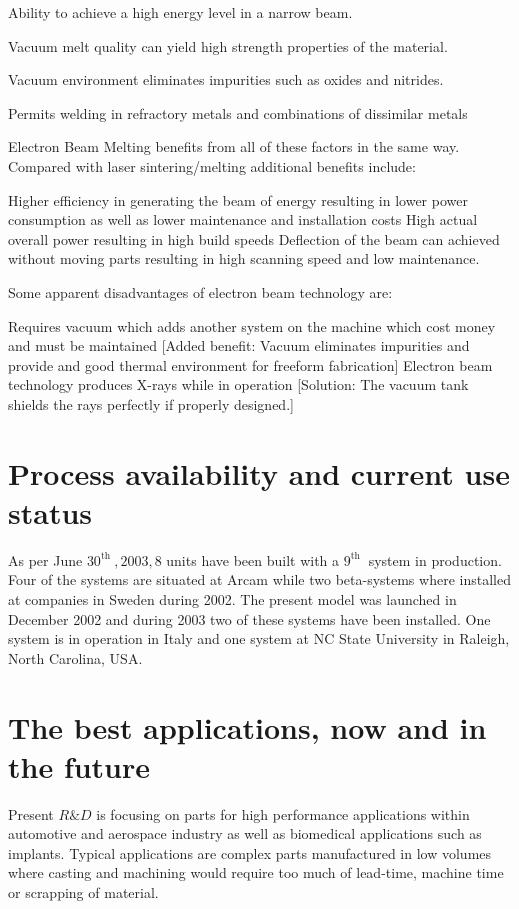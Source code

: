 \documentclass[10pt]{article}
\begin{document}
Ability to achieve a high energy level in a narrow beam.

Vacuum melt quality can yield high strength properties of the material.

Vacuum environment eliminates impurities such as oxides and nitrides.

Permits welding in refractory metals and combinations of dissimilar metals

Electron Beam Melting benefits from all of these factors in the same way. Compared with laser sintering/melting additional benefits include:

Higher efficiency in generating the beam of energy resulting in lower power consumption as well as lower maintenance and installation costs High actual overall power resulting in high build speeds Deflection of the beam can achieved without moving parts resulting in high scanning speed and low maintenance.

Some apparent disadvantages of electron beam technology are:

Requires vacuum which adds another system on the machine which cost money and must be maintained [Added benefit: Vacuum eliminates impurities and provide and good thermal environment for freeform fabrication] Electron beam technology produces X-rays while in operation [Solution: The vacuum tank shields the rays perfectly if properly designed.]

\section*{Process availability and current use status}
As per June $30^{\text {th }}, 2003,8$ units have been built with a $9^{\text {th }}$ system in production. Four of the systems are situated at Arcam while two beta-systems where installed at companies in Sweden during 2002. The present model was launched in December 2002 and during 2003 two of these systems have been installed. One system is in operation in Italy and one system at NC State University in Raleigh, North Carolina, USA.

\section*{The best applications, now and in the future}
Present $R \& D$ is focusing on parts for high performance applications within automotive and aerospace industry as well as biomedical applications such as implants. Typical applications are complex parts manufactured in low volumes where casting and machining would require too much of lead-time, machine time or scrapping of material.
\end{document}

